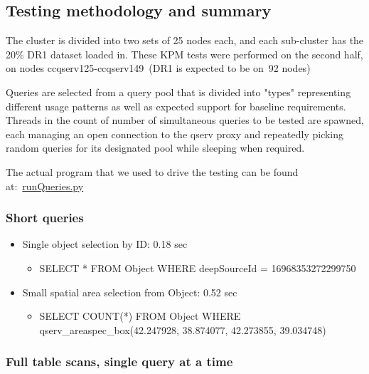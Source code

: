 \subsection{Testing methodology and
summary}\label{testing-methodology-and-summary}

The cluster is divided into two sets of 25 nodes each, and each
sub-cluster has the 20\% DR1 dataset loaded in. These KPM tests were
performed on the second half, on nodes ccqserv125-ccqserv149~(DR1 is
expected to be on~92 nodes)

Queries are selected from a query pool that is divided into "types"
representing different usage patterns as well as expected support for
baseline requirements. Threads in the count of number of simultaneous
queries to be tested are spawned, each managing an open connection to
the qserv proxy and repeatedly picking random queries for its designated
pool while sleeping when required.

The actual program that we used to drive the testing can be found
at:~\href{https://github.com/lsst/qserv/blob/master/admin/tools/docker/deployment/in2p3/runQueries.py}{runQueries.py}

\subsubsection{\texorpdfstring{\textbf{Short
queries}}{Short queries}}\label{short-queries}

\begin{itemize}
\item
  Single object selection by ID: 0.18 sec

  \begin{itemize}
  \item
    SELECT * FROM Object WHERE deepSourceId = 16968353272299750
  \end{itemize}
\item
  Small spatial area selection from Object: 0.52 sec

  \begin{itemize}
  \item
    SELECT COUNT(*) FROM Object WHERE qserv\_areaspec\_box(42.247928,
    38.874077, 42.273855, 39.034748)
  \end{itemize}
\end{itemize}

\subsubsection{\texorpdfstring{\textbf{Full table scans, single query at
a
time}}{Full table scans, single query at a time}}\label{full-table-scans-single-query-at-a-time}

